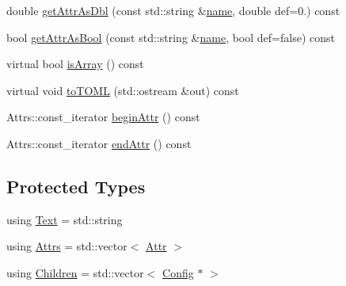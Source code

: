 \begin{DoxyCompactItemize}
\item 
double \hyperlink{classtheoria_1_1config_1_1Config_a9920f07e7a493ad3c5d5712abc85f301}{get\+Attr\+As\+Dbl} (const std\+::string \&\hyperlink{classtheoria_1_1config_1_1Config_af4929f1c9b86576fdc439051a10f89cd}{name}, double def=0.) const
\item 
bool \hyperlink{classtheoria_1_1config_1_1Config_adcfd22ac6dc3293f1306a33591ab53c8}{get\+Attr\+As\+Bool} (const std\+::string \&\hyperlink{classtheoria_1_1config_1_1Config_af4929f1c9b86576fdc439051a10f89cd}{name}, bool def=false) const
\item 
virtual bool \hyperlink{classtheoria_1_1config_1_1Config_a1c634f42efd6c6d4463136ec24a1e7e5}{is\+Array} () const
\item 
virtual void \hyperlink{classtheoria_1_1config_1_1Config_a6fe5db76067cd30d5b5ed02c49770d6f}{to\+T\+O\+ML} (std\+::ostream \&out) const
\item 
Attrs\+::const\+\_\+iterator \hyperlink{classtheoria_1_1config_1_1Config_a4bd7712d99a507b1da47da9257094051}{begin\+Attr} () const
\item 
Attrs\+::const\+\_\+iterator \hyperlink{classtheoria_1_1config_1_1Config_a3d4ea72c3b43c8674456fdc263d39e39}{end\+Attr} () const
\end{DoxyCompactItemize}
\subsection*{Protected Types}
\begin{DoxyCompactItemize}
\item 
using \hyperlink{classtheoria_1_1config_1_1Config_ac1325f2d355e7c617dcd16d561ee2429}{Text} = std\+::string
\item 
using \hyperlink{classtheoria_1_1config_1_1Config_a3590578a57d530fe1e51d25b0e492f7d}{Attrs} = std\+::vector$<$ \hyperlink{structtheoria_1_1config_1_1Config_1_1Attr}{Attr} $>$
\item 
using \hyperlink{classtheoria_1_1config_1_1Config_acc6cccfd7dd23be9bbd053c55a1e8eb7}{Children} = std\+::vector$<$ \hyperlink{classtheoria_1_1config_1_1Config}{Config} $\ast$ $>$
\end{DoxyCompactItemize}
